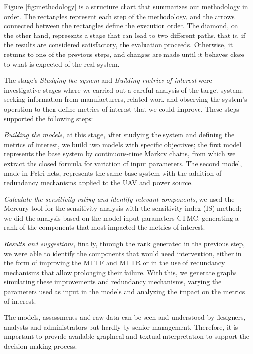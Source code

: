 \documentclass[conference]{IEEEtran}
\begin{document}
Figure \ref{fig:methodology} is a structure chart that summarizes our methodology in order. The rectangles represent each step of the methodology, and the arrows connected between the rectangles define the execution order. The diamond, on the other hand, represents a stage that can lead to two different paths, that is, if the results are considered satisfactory, the evaluation proceeds. Otherwise, it returns to one of the previous steps, and changes are made until it behaves close to what is expected of the real system.

The stage's \textit{Studying the system} and \textit{Building metrics of interest} were investigative stages where we carried out a careful analysis of the target system; seeking information from manufacturers, related work and observing the system's operation to then define metrics of interest that we could improve. These steps supported the following steps:

\textit{Building the models}, at this stage, after studying the system and defining the metrics of interest, we build two models with specific objectives; the first model represents the base system by continuous-time Markov chains, from which we extract the closed formula for variation of input parameters. The second model, made in Petri nets, represents the same base system with the addition of redundancy mechanisms applied to the UAV and power source.

\textit{Calculate the sensitivity rating and identify relevant components}, we used the Mercury tool \citep{maciel2017mercury} for the sensitivity analysis with the sensitivity index (IS) method; we did the analysis based on the model input parameters CTMC, generating a rank of the components that most impacted the metrics of interest.

\textit{Results and suggestions}, finally, through the rank generated in the previous step, we were able to identify the components that would need intervention, either in the form of improving the MTTF and MTTR or in the use of redundancy mechanisms that allow prolonging their failure. With this, we generate graphs simulating these improvements and redundancy mechanisms, varying the parameters used as input in the models and analyzing the impact on the metrics of interest. 

The models, assessments and raw data can be seen and understood by designers, analysts and administrators but hardly by senior management. Therefore, it is important to provide available graphical and textual interpretation to support the decision-making process\citep{melo2021distributed}. 
\end{document}
